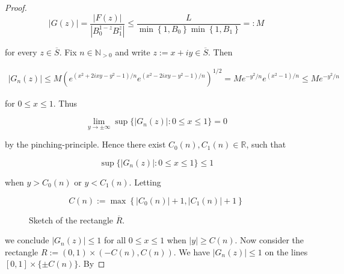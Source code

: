 \begin{proof}
\begin{equation*}
	\left| G(z)\right| = \frac{\left| F(z)\right|}{\left| B_0^{1 - z}B_1^z \right|} \leq \frac{L}{\min\left\{1,B_0\right\}\min\left\{1,B_1\right\}} =: M
\end{equation*}

\noindent for every $z \in \overline{S}$. Fix $n \in \mathbb{N}_{>0}$ and write $z := x + iy \in \overline{S}$. Then

\begin{gather*}
	\left| G_n(z)\right| \leq M \left(e^{\left(x^2 + 2ixy -y^2 - 1\right)/n} e^{\left(x^2 - 2ixy -y^2 - 1\right)/n}\right)^{1/2}= M e^{-y^2/n}e^{\left(x^2 - 1\right)/n} \leq Me^{-y^2/n}
\end{gather*}

\noindent for $0 \leq x \leq 1$. Thus
	
\begin{equation*}
	\lim_{y \to \pm \infty}\sup\{\left| G_n(z)\right| : 0 \leq x \leq 1\} = 0
\end{equation*}

\noindent by the pinching-principle. Hence there exist $C_0(n),C_1(n) \in \mathbb{R}$, such that 

\begin{equation*}
	\sup\{\left| G_n(z)\right| : 0 \leq x \leq 1\} \leq 1
\end{equation*}

\noindent when $y > C_0(n)$ or $y < C_1(n)$. Letting

\begin{equation*}
	C(n) := \max\left\{ \left| C_0(n)\right| + 1, \left| C_1(n) \right| + 1\right\}
\end{equation*}

\begin{figure}[h!tb]
	\centering
	\caption{Sketch of the rectangle $\overline{R}$.}
	\label{fig:Hadamards_three_lines_lemma_proof}
\end{figure}

\noindent we conclude $\left| G_n(z) \right| \leq 1$ for all $0 \leq x \leq 1$ when $\left| y \right| \geq C(n)$. Now consider the rectangle $R := \left(0,1\right) \times \left(-C(n),C(n)\right)$. We have $\left| G_n(z) \right| \leq 1$ on the lines $[0,1] \times \{\pm C(n)\}$. By


\end{proof}
